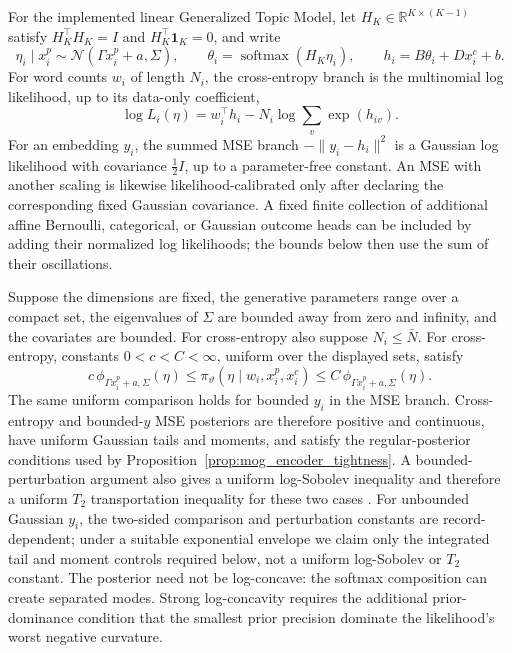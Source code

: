 For the implemented linear Generalized Topic Model, let
$H_K\in\mathbb R^{K\times(K-1)}$ satisfy
$H_K^\top H_K=I$ and $H_K^\top\mathbf1_K=0$, and write
\begin{equation}
 \eta_i\mid x_i^p\sim
 \mathcal N(\Gamma x_i^p+a,\Sigma),\qquad
 \theta_i=\operatorname{softmax}(H_K\eta_i),\qquad
 h_i=B\theta_i+D x_i^c+b.
 \label{eq:gtm_exact_linear_model}
\end{equation}
For word counts $w_i$ of length $N_i$, the cross-entropy branch is the
multinomial log likelihood, up to its data-only coefficient,
\[
 \log L_i(\eta)=w_i^\top h_i-N_i\log\sum_v\exp(h_{iv}).
\]
For an embedding $y_i$, the summed MSE branch
$-\|y_i-h_i\|^2$ is a Gaussian log likelihood with covariance
$\tfrac12I$, up to a parameter-free constant.  An MSE with another scaling is
likewise likelihood-calibrated only after declaring the corresponding fixed
Gaussian covariance.  A fixed finite collection of additional affine
Bernoulli, categorical, or Gaussian outcome heads can be included by adding
their normalized log likelihoods; the bounds below then use the sum of their
oscillations.

\begin{proposition}
\label{prop:gtm_bounded_tilt}
Suppose the dimensions are fixed, the generative parameters range over a
compact set, the eigenvalues of $\Sigma$ are bounded away from zero and
infinity, and the covariates are bounded.  For cross-entropy also suppose
$N_i\leq\bar N$.  For cross-entropy, constants $0<c<C<\infty$, uniform over
the displayed sets, satisfy
\begin{equation}
 c\,\phi_{\Gamma x_i^p+a,\Sigma}(\eta)
 \leq\pi_\vartheta(\eta\mid w_i,x_i^p,x_i^c)
 \leq C\,\phi_{\Gamma x_i^p+a,\Sigma}(\eta).
 \label{eq:gtm_gaussian_comparison}
\end{equation}
The same uniform comparison holds for bounded $y_i$ in the MSE branch.
Cross-entropy and bounded-$y$ MSE posteriors are therefore positive and
continuous, have uniform Gaussian tails and moments, and satisfy the
regular-posterior conditions used by
Proposition~\ref{prop:mog_encoder_tightness}.  A bounded-perturbation argument
also gives a uniform log-Sobolev inequality and therefore a uniform $T_2$
transportation inequality for these two cases \citep{OttoVillani2000}.  For
unbounded Gaussian $y_i$, the two-sided comparison and perturbation constants
are record-dependent; under a suitable exponential envelope we claim only the
integrated tail and moment controls required below, not a uniform log-Sobolev
or $T_2$ constant.  The posterior need not be log-concave: the softmax
composition can create separated modes.  Strong log-concavity requires the
additional prior-dominance condition that the smallest prior precision
dominate the likelihood's worst negative curvature.
\end{proposition}


